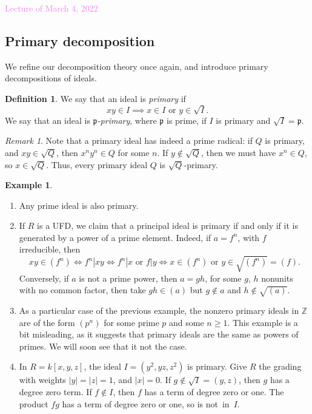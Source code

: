 \documentclass{amsart}[12pt]
\newcommand{\Mar}[1]{\textcolor{violet}{Lecture of March #1, 2022}}
\newcommand{\p}{{\mathfrak p}}
\numberwithin{equation}{section}
\theoremstyle{plain} %
\theoremstyle{definition}
\newtheorem{definition}[equation]{Definition}
\newtheorem{example}[equation]{Example}
\theoremstyle{remark}
\newtheorem{remark}[equation]{Remark}
\newcommand{\ssec}[1]{\subsection{#1}}
\begin{document}
\Mar{4}

\ssec{Primary decomposition}

We refine our decomposition theory once again, and introduce primary decompositions of ideals. 
\begin{definition}
	We say that an ideal is {\em primary} if 
	$$xy\in I \implies x\in I \text{ or } y\in \sqrt{I}.$$
	We say that an ideal is {\em $\p$-primary}\index{$\p$-primary ideal}, where $\p$ is prime, if $I$ is primary and $\sqrt{I}=\p$.
\end{definition}

\begin{remark}
	Note that a primary ideal has indeed a prime radical: if $Q$ is primary, and $xy\in \sqrt{Q}$, then $x^n y^n\in Q$ for some $n$. If $y\notin \sqrt{Q}$, then we must have $x^n\in Q$, so $x\in \sqrt{Q}$. Thus, every primary ideal $Q$ is $\sqrt{Q}$-primary.
\end{remark}


\begin{example}$\,$\label{example primary ideals}
	\begin{enumerate}
		\item Any prime ideal is also primary.
		\item If $R$ is a UFD, we claim that a principal ideal is primary if and only if it is generated by a power of a prime element. Indeed, if $a=f^n$, with $f$ irreducible, then 
		$$xy\in (f^n) \Longleftrightarrow f^n | xy \Longleftrightarrow f^n | x \text{ or } f| y \Longleftrightarrow x\in (f^n) \text{ or } y\in \sqrt{(f^n)} = (f).$$ 
		Conversely, if $a$ is not a prime power, then $a=gh$, for some $g$, $h$ nonunits with no common factor, then take $gh\in (a)$ but $g\notin a$ and $h\notin \sqrt{(a)}$.
		\item As a particular case of the previous example, the nonzero primary ideals in $\mathbb{Z}$ are of the form $(p^n)$ for some prime $p$ and some $n \geqslant 1$. This example is a bit misleading, as it suggests that primary ideals are the same as powers of primes. We will soon see that it not the case.
		\item\label{example powers primary} In $R=k[x,y,z]$, the ideal $I=(y^2,yz,z^2)$ is primary. Give $R$ the grading with weights $|y|=|z|=1$, and $|x|=0$. If $g\notin \sqrt{I}=(y,z)$, then $g$ has a degree zero term. If $f\notin I$, then $f$ has a term of degree zero or one. The product $fg$ has a term of degree zero or one, so is not~in~$I$.
	\end{enumerate}
\end{example}
\end{document}
